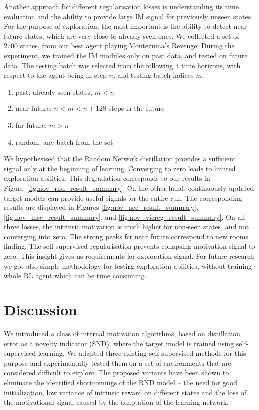 \documentclass[a4paper,11pt]{elsarticle}
\begin{document}
Another approach for different regularisation losses is understanding its time evaluation and the ability to provide large IM signal for previously unseen states. For the purpose of exploration, the most important is the ability to detect near future states, which are very close to already seen ones. We collected a set of 2700 states, from our best agent playing Montezuma's Revenge. During the experiment, we trained the IM modules only on past data, and tested on future data. The testing batch was selected from the following 4 time horizons, with respect to the agent being in step $n$, and testing batch indices $m$:
\begin{enumerate}
    \item past: already seen states, $m<n$
    \item near future: $n < m < n+128$ steps in the future
    \item far future: $m > n$
    \item random: any batch from the set
\end{enumerate}

We hypothesised that the Random Network distillation provides a sufficient signal only at the beginning of learning. Converging to zero leads to limited exploration abilities. This degradation corresponds to our results in Figure~\ref{fig:nov_rnd_result_summary}.
On the other hand, continuously updated target models can provide useful signals for the entire run. The corresponding results are displayed in Figures \ref{fig:nov_nce_result_summary}, \ref{fig:nov_mse_result_summary}, and \ref{fig:nov_vicreg_result_summary}. On all three losses, the intrinsic motivation is much higher for non-seen states, and not converging into zero. The strong peeks for near future correspond to new rooms finding. The self supervised regularisation prevents collapsing motivation signal to zero. 
This insight gives us requirements for exploration signal.
For future research we got also simple methodology for testing exploration abilities, without training whole RL agent which can be time consuming. 


\section{Discussion}
\label{sec:discussion}

We introduced a class of internal motivation algorithms, based on distillation error as a novelty indicator (SND), where the target model is trained using self-supervised learning. We adapted three existing self-supervised methods for this purpose and experimentally tested them on a set of environments that are considered difficult to explore.
The proposed variants have been shown to eliminate the identified shortcomings of the RND model -- the need for good initialization, low variance of intrinsic reward on different states and the loss of the motivational signal caused by the adaptation of the learning network.
\end{document}
